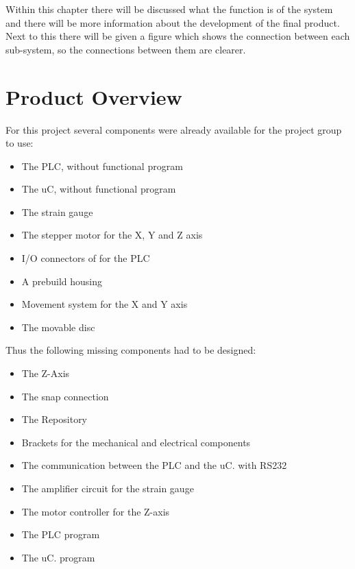 \documentclass[a4paper,12pt]{scrreprt}
\begin{document}
Within this chapter there will be discussed what the function is of the system and there will be more information about the development of the final product. Next to this there will be given a figure which shows the connection between each sub-system, so the connections between them are clearer.

\section{Product Overview}


For this project several components were already available for the project group to use:
\begin{itemize}
\item The \acs{PLC}, without functional program
\item The \acs{uC}, without functional program
\item The strain gauge
\item The stepper motor for the X, Y and Z axis
\item \acs{I/O} connectors of for the \acs{PLC}
\item A prebuild housing 
\item Movement system for the X and Y axis
\item The movable disc
\end{itemize}

Thus the following missing components had to be designed:
\begin{itemize}
\item The Z-Axis
\item The snap connection
\item The \acs{Repository}
\item Brackets for the mechanical and electrical components
\item The communication between the \acs{PLC} and the \acs{uC}. with \acs{RS232}
\item The amplifier circuit for the strain gauge
\item The motor controller for the Z-axis
\item The \acs{PLC} program
\item The \acs{uC}. program
\end{itemize}
\end{document}
